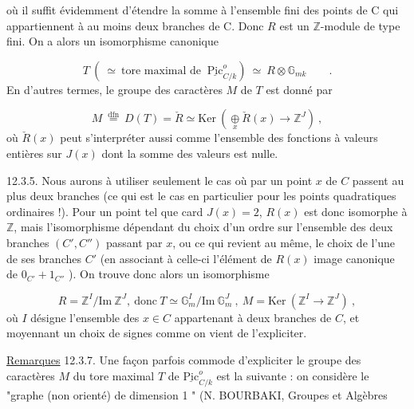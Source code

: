 
où il suffit évidemment d'étendre la somme à l'ensemble fini des points de C qui appartiennent à au moins deux branches de C. Donc $R$ est un $\mathbb{Z}$-module de type fini. On a alors un isomorphisme canonique

\begin{equation}\tag{12.3.3}
T\ (\ \simeq\ \mbox{tore maximal de }\ \underline{\mathrm{Pic}}^{o}_{C/k})\ \simeq\ R \otimes \mathbb{G}_{mk}\qquad .
\end{equation}
En d'autres termes, le groupe des caractères $M$ de $T$ est donné par

\begin{equation}\tag{12.3.4}
M\ \stackrel{\mathrm{dfn}}{=}\ D(T) = \check{R} \simeq \mathrm{Ker}\ (\mathop{\oplus}\limits_{x} \check{R}(x) \longrightarrow \mathbb{Z}^{J})\ ,
\end{equation}
où $\check{R}(x)$ peut s'interpréter aussi comme l'ensemble des fonctions à valeurs entières sur $J(x)$ dont la somme des valeurs est nulle.

12.3.5. Nous aurons à utiliser seulement le cas où par un point $x$ de $C$ passent au plus deux branches (ce qui est le cas en particulier pour les points quadratiques ordinaires !). Pour un point tel que card $J(x) = 2$, $R(x)$ est donc isomorphe à $\mathbb{Z}$, mais l'isomorphisme dépendant du choix d'un ordre sur l'ensemble des deux branches $(C',C'')$ passant par $x$, ou ce qui revient au même, le choix de l'une de ses branches $C'$ (en associant à celle-ci l'élément de $R(x)$ image canonique de $0_{C'} + 1_{C''}$ ). On trouve donc alors un isomorphisme

\begin{equation}\tag{12.3.6}
R = \mathbb{Z}^{I}/\mathrm{Im}\ \mathbb{Z}^{J},\ \mbox{donc}\ T \simeq \mathbb{G}_{m}^{I}/\mathrm{Im}\ \mathbb{G}_{m}^{J}\ ,\ M = \mathrm{Ker}\ (\mathbb{Z}^{I} \longrightarrow \mathbb{Z}^{J})\ ,
\end{equation}
où $I$ désigne l'ensemble des $x \in C$ appartenant à deux branches de $C$, et moyennant un choix de signes comme on vient de l'expliciter.

\underline{Remarques} 12.3.7. Une façon parfois commode d'expliciter le groupe des caractères $M$ du tore maximal $T$ de $\underline{\mathrm{Pic}}^{o}_{C/k}$ est la suivante : on considère le "graphe (non orienté) de dimension 1 " (N. BOURBAKI, Groupes et Algèbres



